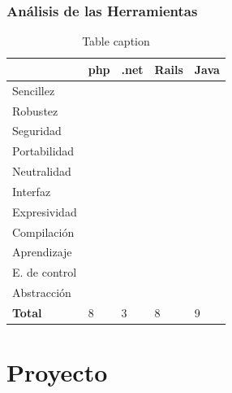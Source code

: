 \documentclass{beamer}
\newcommand{\cmark}{\ding{51}}%
\newcommand{\xmark}{\ding{55}}%
\begin{document}
\begin{frame}
\frametitle{Análisis de las Herramientas}
\begin{table}
\begin{tabular}{l l l l l}
\toprule
				& \textbf{php} & \textbf{.net} & \textbf{Rails} & \textbf{Java}\\
\midrule
Sencillez 		& \textcolor{green}{\cmark} & \textcolor{red}{\xmark}   & \textcolor{red}{\xmark}   &\textcolor{green}{\cmark}\\
Robustez 		& \textcolor{red}{\xmark}   & \textcolor{green}{\cmark} & \textcolor{green}{\cmark} &\textcolor{green}{\cmark}\\
Seguridad 		& \textcolor{red}{\xmark}   & \textcolor{red}{\xmark}   & \textcolor{green}{\cmark} &\textcolor{green}{\cmark}\\
Portabilidad 	& \textcolor{green}{\cmark} & \textcolor{red}{\xmark}   & \textcolor{red}{\xmark}   &\textcolor{green}{\cmark}\\
Neutralidad 	& \textcolor{green}{\cmark} & \textcolor{red}{\xmark}   & \textcolor{green}{\cmark} &\textcolor{green}{\cmark}\\
Interfaz 		& \textcolor{red}{\xmark}   & \textcolor{green}{\cmark} & \textcolor{green}{\cmark} &\textcolor{green}{\cmark}\\
Expresividad 	& \textcolor{green}{\cmark} & \textcolor{red}{\xmark}   & \textcolor{green}{\cmark} &\textcolor{red}{\xmark}\\
Compilación 	& \textcolor{green}{\cmark} & \textcolor{red}{\xmark}   & \textcolor{green}{\cmark} &\textcolor{red}{\xmark}\\
Aprendizaje 	& \textcolor{green}{\cmark} & \textcolor{red}{\xmark}   & \textcolor{green}{\cmark} &\textcolor{green}{\cmark}\\
E. de control 	& \textcolor{green}{\cmark} & \textcolor{green}{\cmark} & \textcolor{green}{\cmark} &\textcolor{green}{\cmark}\\
Abstracción 	& \textcolor{green}{\cmark} & \textcolor{red}{\xmark}   & \textcolor{red}{\xmark}   &\textcolor{green}{\cmark}\\
\textbf{Total}  & 8 & 3 & 8 & 9\\
\bottomrule
\end{tabular}
\caption{Table caption}
\end{table}
\end{frame}


\section{Proyecto}
\end{document}
